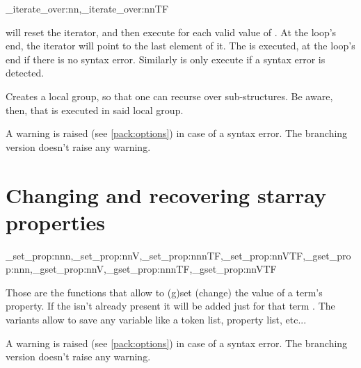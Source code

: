 \documentclass[10pt]{article}
\begin{document}
\begin{codedescribe}[code,new=2023/11/04]{\starray_iterate_over:nn,\starray_iterate_over:nnTF}
\begin{codesyntax}%
\end{codesyntax}
 will reset the  iterator, and then execute  for each valid value of . At the loop's end, the  iterator will point to the last element of it. The  is executed, at the loop's end if there is no syntax error. Similarly  is only execute if a syntax error is detected.
\end{codedescribe}
\begin{tsremark}
 Creates a local group, so that one can recurse over sub-structures. Be aware, then, that  is executed in said local group.
\end{tsremark}
\begin{tsremark}
A warning is raised (see \ref{pack:options}) in case of a  syntax error. The branching version doesn't raise any warning.
\end{tsremark}



\section{Changing and recovering starray properties}\label{pack:get/set}

\begin{codedescribe}{\starray_set_prop:nnn,\starray_set_prop:nnV,\starray_set_prop:nnnTF,\starray_set_prop:nnVTF,\starray_gset_prop:nnn,\starray_gset_prop:nnV,\starray_gset_prop:nnnTF,\starray_gset_prop:nnVTF}
\begin{codesyntax}%
\end{codesyntax}
\end{codedescribe}
Those are the functions that allow to (g)set (change) the value of a term's property. If the  isn't already present it will be added just for that term . The  variants allow to save any variable like a token list, property list, etc...
\begin{tsremark}
A warning is raised (see \ref{pack:options}) in case of a  syntax error. The branching version doesn't raise any warning.
\end{tsremark}
\end{document}
